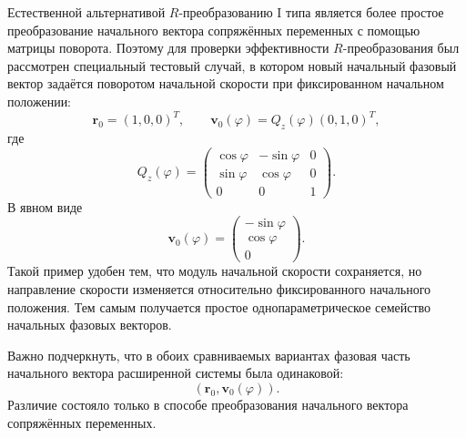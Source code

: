 Естественной альтернативой \(R\)-преобразованию I типа является более простое преобразование начального вектора сопряжённых переменных с помощью матрицы поворота. Поэтому для проверки эффективности \(R\)-преобразования был рассмотрен специальный тестовый случай, в котором новый начальный фазовый вектор задаётся поворотом начальной скорости при фиксированном начальном положении:
\begin{equation}
\mathbf r_0=(1,0,0)^T,
\qquad
\mathbf v_0(\varphi)=Q_z(\varphi)(0,1,0)^T,
\end{equation}
где
\begin{equation}
Q_z(\varphi)=
\begin{pmatrix}
	\cos\varphi & -\sin\varphi & 0\\
	\sin\varphi & \cos\varphi  & 0\\
	0           & 0            & 1
\end{pmatrix}.
\end{equation}
В явном виде
\begin{equation}
\mathbf v_0(\varphi)=
\begin{pmatrix}
	-\sin\varphi\\
	\cos\varphi\\
	0
\end{pmatrix}.
\end{equation}
Такой пример удобен тем, что модуль начальной скорости сохраняется, но направление скорости изменяется относительно фиксированного начального положения. Тем самым получается простое однопараметрическое семейство начальных фазовых векторов.

Важно подчеркнуть, что в обоих сравниваемых вариантах фазовая часть начального вектора расширенной системы была одинаковой:
\begin{equation}
(\mathbf r_0,\mathbf v_0(\varphi)).
\end{equation}
Различие состояло только в способе преобразования начального вектора сопряжённых переменных.

